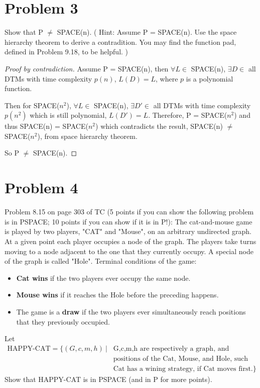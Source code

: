 \documentclass[twoside,11pt]{homework}
\begin{document}
\section*{Problem 3}

\begin{prob}
  Show that P $\ne$ SPACE(n).
  ( Hint: Assume P = SPACE(n).
    Use the space hierarchy theorem to derive a contradition.
    You may find the function pad, defined in Problem 9.18, to be helpful.
  )
\end{prob}
\begin{proof}[Proof by contradiction]
  Assume P = SPACE(n), then $\forall L \in$ SPACE(n), $\exists D \in$ all DTMs with time
  complexity $p(n)$, $L(D) = L$, where $p$ is a polynomial function.

  Then for SPACE($n^2$), $\forall L \in$ SPACE(n), $\exists D' \in$ all DTMs with time
  complexity $p(n^2)$ which is still polynomial, $L(D') = L$.
  Therefore, P = SPACE($n^2$) and thus SPACE(n) = SPACE($n^2$) which contradicts
  the result, SPACE(n) $\ne$ SPACE($n^2$), from space hierarchy theorem.

  So P $\ne$ SPACE(n).

\end{proof}

\section*{Problem 4}

\begin{prob}
  Problem 8.15 on page 303 of TC (5 points if you can show the following problem
  is in PSPACE; 10 points if you can show if it is in P!):
  The cat-and-mouse game is played by two players, "CAT" and "Mouse", on an
  arbitrary undirected graph.
  At a given point each player occupies a node of the graph.
  The players take turns moving to a node adjacent to the one that they
  currently occupy.
  A special node of the graph is called "Hole".
  Terminal conditions of the game:
  \begin{itemize}
  \item \textbf{Cat wins} if the two players ever occupy the same node.
  \item \textbf{Mouse wins} if it reaches the Hole before the preceding happens.
  \item The game is a \textbf{draw} if the two players ever simultaneously reach
    positions that they previously occupied.
  \end{itemize} 
  Let
  \[
    \begin{aligned}
      \text{HAPPY-CAT} = \{ (G,c,m,h) \ | \
      &\text{G,c,m,h are respectively a graph, and}\\
      &\text{positions of the Cat, Mouse, and Hole, such that}\\
      &\text{Cat has a wining strategy, if Cat moves first}.\}
    \end{aligned}
  \]
  Show that HAPPY-CAT is in PSPACE (and in P for more points).
\end{prob}
\end{document}
